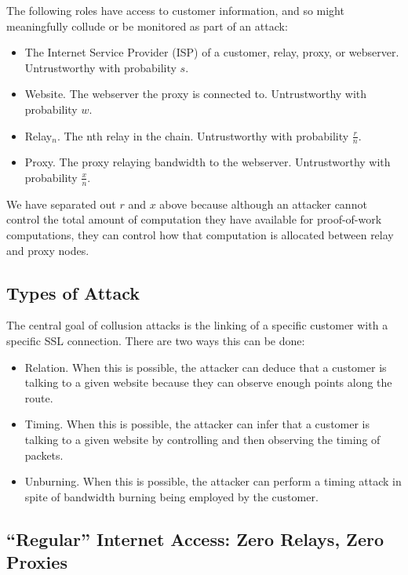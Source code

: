 The following roles have access to customer information, and so might
meaningfully collude or be monitored as part of an attack:

\begin{itemize}
\item The Internet Service Provider (ISP) of a customer, relay, proxy,
  or webserver. Untrustworthy with probability $s$.
\item Website. The webserver the proxy is connected to. Untrustworthy
  with probability $w$.
\item Relay$_n$. The nth relay in the chain. Untrustworthy with
  probability $\frac{r}{n}$.
\item Proxy. The proxy relaying bandwidth to the
  webserver. Untrustworthy with probability $\frac{x}{n}$.
\end{itemize}

We have separated out $r$ and $x$ above because although an attacker
cannot control the total amount of computation they have available for
proof-of-work computations, they can control how that computation is
allocated between relay and proxy nodes.

\subsection{Types of Attack}

The central goal of collusion attacks is the linking of a specific
\Orchid{} customer with a specific SSL connection. There are two ways
this can be done:

\begin{itemize}
\item Relation. When this is possible, the attacker can deduce that a
  customer is talking to a given website because they can observe
  enough points along the route.
\item Timing. When this is possible, the attacker can infer that a
  customer is talking to a given website by controlling and then
  observing the timing of packets.
\item Unburning. When this is possible, the attacker can perform a
  timing attack in spite of bandwidth burning being employed by the
  customer.
\end{itemize}

\subsection{``Regular'' Internet Access: Zero Relays, Zero Proxies}

